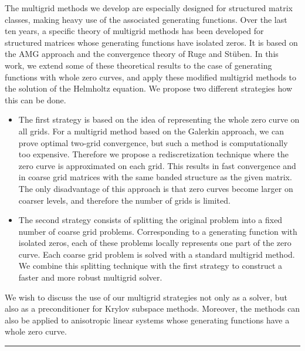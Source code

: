 \documentclass[twosided]{report}
\begin{document}
The multigrid methods we develop are especially designed for
structured matrix classes, making heavy use of the
associated generating functions. Over the last ten years, a
specific theory of multigrid methods has been developed for
structured matrices whose generating functions have isolated
zeros. It is based on the AMG approach and the convergence
theory of Ruge and St\"uben. In this work, we extend some of
these theoretical results to the case of generating
functions with whole zero curves, and apply these modified
multigrid methods to the solution of the Helmholtz equation.
We propose two different strategies how this can be done.
\begin{itemize}
\item The first strategy is based on the
idea of representing the whole zero curve on all grids. For
a multigrid method based on the Galerkin approach, we can
prove optimal two-grid convergence, but such a method is
computationally too expensive. Therefore we propose a
rediscretization technique where the zero curve is
approximated on each grid. This results in fast convergence
and in coarse grid matrices with the same banded structure
as the given matrix. The only disadvantage of this approach
is that zero curves become larger on coarser levels, and
therefore the number of grids is limited.
\item The second
strategy consists of splitting the original problem into a
fixed number of coarse grid problems. Corresponding to a
generating function with isolated zeros, each of these
problems locally represents one part of the zero curve. Each
coarse grid problem is solved with a standard multigrid
method. We combine this splitting technique with the first
strategy to construct a faster and more robust multigrid
solver.
\end{itemize}
We wish to discuss the use of our
multigrid strategies not only as a solver, but also as a
preconditioner for Krylov subspace methods. Moreover, the
methods can also be applied to anisotropic linear systems
whose generating functions have a whole zero curve.



	\begin{center} \rule{6in}{1pt} \end{center}
\end{document}

